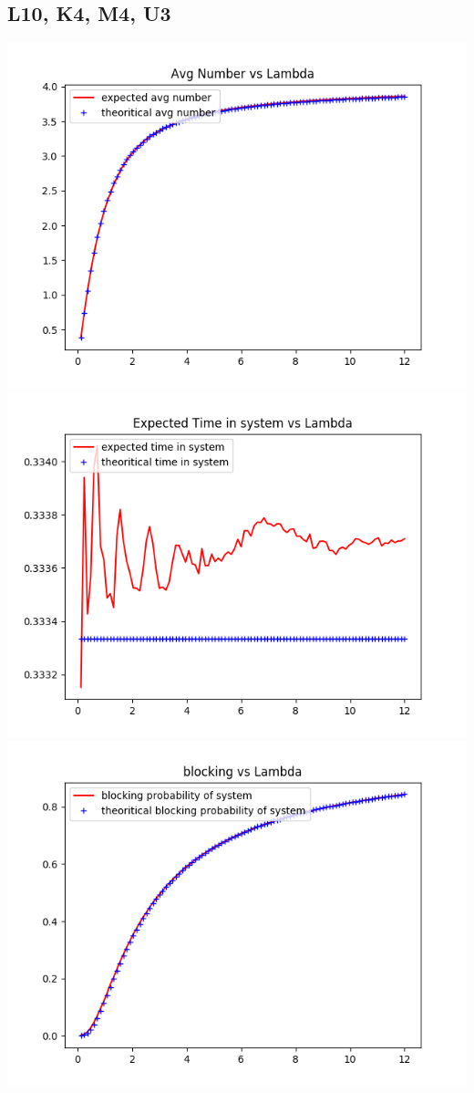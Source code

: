 \documentclass[11pt]{article}
\begin{document}
  \subsection{L10, K4, M4, U3}
 \includegraphics{ExpectedNumber_L10_K4_M4_U3}
  \includegraphics{ExpectedTime_L10_K4_M4_U3}
 \includegraphics{BlockingProbability_L10_K4_M4_U3}
\end{document}
